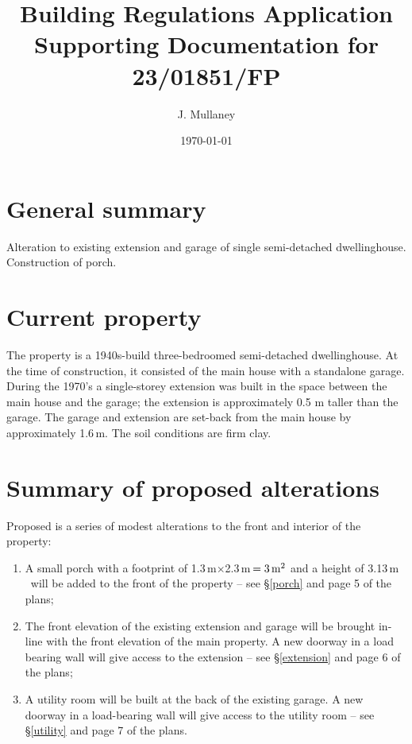\documentclass{extension}
\newcommand{\m}{\,$\mathrm{m}$}
\begin{document}
\title{Building Regulations Application \\[2mm]
Supporting Documentation for 23/01851/FP}
\author{J. Mullaney}
\date{\today}

\maketitle

\vspace{5mm}
\section{General summary}
Alteration to existing extension and garage of single semi-detached dwellinghouse. Construction of porch.

\section{Current property}
The property is a 1940s-build three-bedroomed semi-detached dwellinghouse. At the time of construction, it consisted of the main house with a standalone garage. During the 1970’s a single-storey extension was built in the space between the main house and the garage; the extension is approximately 0.5 m taller than the garage. The garage and extension are set-back from the main house by approximately 1.6\,m. The soil conditions are firm clay.

\section{Summary of proposed alterations}
Proposed is a series of modest alterations to the front and interior of the property:
\begin{enumerate}
  \item A small porch with a footprint of 1.3\m$\times$2.3\m\,$=3\,{\rm m^2}$ and a height of 3.13\m\ will be added to the front of the property -- see \S\ref{porch} and page 5 of the plans;
  \item The front elevation of the existing extension and garage will be brought in-line with the front elevation of the main property. A new doorway in a load bearing wall will give access to the extension -- see \S\ref{extension} and page 6 of the plans;\\
  \item A utility room will be built at the back of the existing garage. A new doorway in a load-bearing wall will give access to the utility room -- see \S\ref{utility} and page 7 of the plans.
\end{enumerate}
\end{document}
